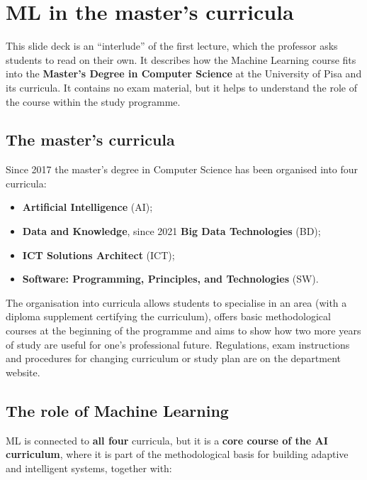 \chapter{ML in the master's curricula}\label{ch-02}

This slide deck is an ``interlude'' of the first lecture, which the
professor asks students to read on their own. It describes how the
Machine Learning course fits into the \textbf{Master's Degree in
Computer Science} at the University of Pisa and its curricula. It
contains no exam material, but it helps to understand the role of the
course within the study programme.

\section{The master's
curricula}\label{i-curricula-della-magistrale}

Since 2017 the master's degree in Computer Science has been organised
into four curricula:

\begin{itemize}
\tightlist
\item
  \textbf{Artificial Intelligence} (AI);
\item
  \textbf{Data and Knowledge}, since 2021 \textbf{Big Data
  Technologies} (BD);
\item
  \textbf{ICT Solutions Architect} (ICT);
\item
  \textbf{Software: Programming, Principles, and Technologies} (SW).
\end{itemize}

The organisation into curricula allows students to specialise in an
area (with a diploma supplement certifying the curriculum), offers
basic methodological courses at the beginning of the programme and
aims to show how two more years of study are useful for one's
professional future. Regulations, exam instructions and procedures for
changing curriculum or study plan are on the department website.

\section{The role of Machine
Learning}\label{il-ruolo-del-machine-learning}

ML is connected to \textbf{all four} curricula, but it is a
\textbf{core course of the AI curriculum}, where it is part of the
methodological basis for building adaptive and intelligent systems,
together with:

